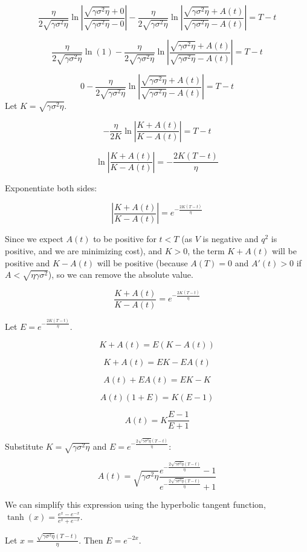 $$\frac{\eta}{2\sqrt{\gamma \sigma^2 \eta}} \ln\left|\frac{\sqrt{\gamma \sigma^2 \eta}+0}{\sqrt{\gamma \sigma^2 \eta}-0}\right| - \frac{\eta}{2\sqrt{\gamma \sigma^2 \eta}} \ln\left|\frac{\sqrt{\gamma \sigma^2 \eta}+A(t)}{\sqrt{\gamma \sigma^2 \eta}-A(t)}\right| = T - t$$

$$\frac{\eta}{2\sqrt{\gamma \sigma^2 \eta}} \ln(1) - \frac{\eta}{2\sqrt{\gamma \sigma^2 \eta}} \ln\left|\frac{\sqrt{\gamma \sigma^2 \eta}+A(t)}{\sqrt{\gamma \sigma^2 \eta}-A(t)}\right| = T - t$$

$$0 - \frac{\eta}{2\sqrt{\gamma \sigma^2 \eta}} \ln\left|\frac{\sqrt{\gamma \sigma^2 \eta}+A(t)}{\sqrt{\gamma \sigma^2 \eta}-A(t)}\right| = T - t$$
Let 
$K = \sqrt{\gamma \sigma^2 \eta}$.

$$-\frac{\eta}{2K} \ln\left|\frac{K+A(t)}{K-A(t)}\right| = T - t$$

$$\ln\left|\frac{K+A(t)}{K-A(t)}\right| = -\frac{2K(T-t)}{\eta}$$

Exponentiate both sides:

$$\left|\frac{K+A(t)}{K-A(t)}\right| = e^{-\frac{2K(T-t)}{\eta}}$$

Since we expect $A(t)$ to be positive for $t < T$ (as $V$ is negative and $q^2$ is positive, and we are minimizing cost), and $K>0$, the term $K+A(t)$ will be positive and $K-A(t)$ will be positive (because 
$A(T)=0$ and $A'(t)>0$ if $A<\sqrt{\eta\gamma\sigma^2}$), so we can remove the absolute value.

$$\frac{K+A(t)}{K-A(t)} = e^{-\frac{2K(T-t)}{\eta}}$$

Let $E = e^{-\frac{2K(T-t)}{\eta}}$.

$$K+A(t) = E(K-A(t))$$

$$K+A(t) = EK - EA(t)$$

$$A(t) + EA(t) = EK - K$$

$$A(t)(1+E) = K(E-1)$$

$$A(t) = K \frac{E-1}{E+1}$$

Substitute $K = \sqrt{\gamma \sigma^2 \eta}$ and $E = e^{-\frac{2\sqrt{\gamma \sigma^2 \eta}(T-t)}{\eta}}$:

$$A(t) = \sqrt{\gamma \sigma^2 \eta} \frac{e^{-\frac{2\sqrt{\gamma \sigma^2 \eta}(T-t)}{\eta}} - 1}{e^{-\frac{2\sqrt{\gamma \sigma^2 \eta}(T-t)}{\eta}} + 1}$$

We can simplify this expression using the hyperbolic tangent function, $\tanh(x) = \frac{e^x - e^{-x}}{e^x + e^{-x}}$.

Let $x = \frac{\sqrt{\gamma \sigma^2 \eta}(T-t)}{\eta}$. Then $E = e^{-2x}$.

